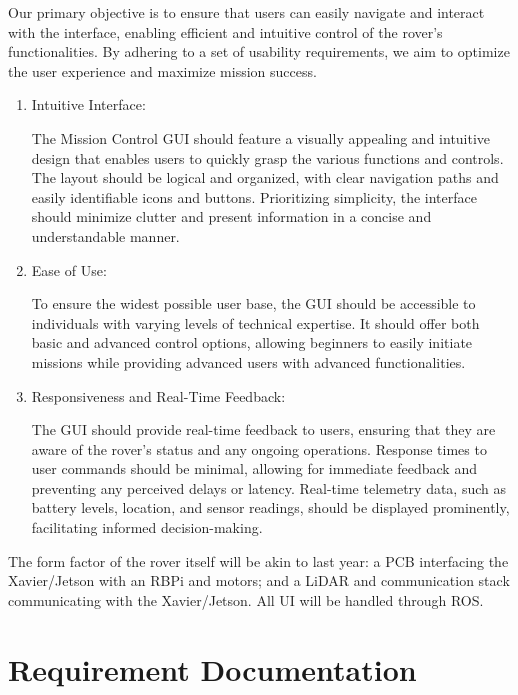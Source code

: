 \documentclass[a4paper, 10pt]{article}
\begin{document}
    Our primary objective is to ensure that users can easily navigate and interact with the interface, enabling efficient and intuitive control of the rover's functionalities. By adhering to a set of usability requirements, we aim to optimize the user experience and maximize mission success.

    \begin{enumerate}
        \item Intuitive Interface:
        
        The Mission Control GUI should feature a visually appealing and intuitive design that enables users to quickly grasp the various functions and controls. The layout should be logical and organized, with clear navigation paths and easily identifiable icons and buttons. Prioritizing simplicity, the interface should minimize clutter and present information in a concise and understandable manner.

        \item Ease of Use:

        To ensure the widest possible user base, the GUI should be accessible to individuals with varying levels of technical expertise. It should offer both basic and advanced control options, allowing beginners to easily initiate missions while providing advanced users with advanced functionalities. 

        \item Responsiveness and Real-Time Feedback:

        The GUI should provide real-time feedback to users, ensuring that they are aware of the rover's status and any ongoing operations. Response times to user commands should be minimal, allowing for immediate feedback and preventing any perceived delays or latency. Real-time telemetry data, such as battery levels, location, and sensor readings, should be displayed prominently, facilitating informed decision-making.
    \end{enumerate}


	
The form factor of the rover itself will be akin to last year: a PCB interfacing the Xavier/Jetson with an RBPi and motors; and a LiDAR and communication stack communicating with the Xavier/Jetson. All UI will be handled through ROS. 

\pagebreak
	
\section{Requirement Documentation}
\end{document}
